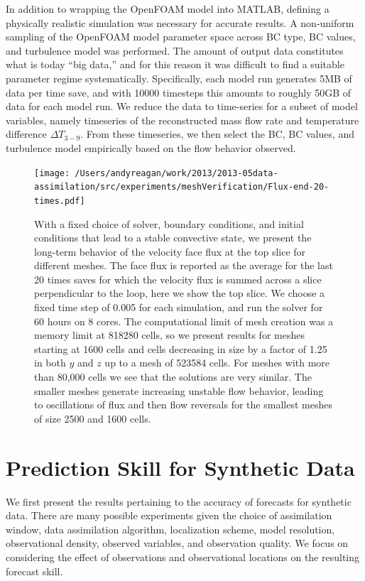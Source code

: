 \documentclass[12pt]{report}
\begin{document}
In addition to wrapping the OpenFOAM model into MATLAB, defining a physically realistic simulation was necessary for accurate results.
A non-uniform sampling of the OpenFOAM model parameter space across BC type, BC values, and turbulence model was performed.
The amount of output data constitutes what is today ``big data,'' and for this reason it was difficult to find a suitable parameter regime systematically.
Specifically, each model run generates 5MB of data per time save, and with 10000 timesteps this amounts to roughly 50GB of data for each model run.
We reduce the data to time-series for a subset of model variables, namely timeseries of the reconstructed mass flow rate and temperature difference $\Delta T_{3-9}$.
From these timeseries, we then select the BC, BC values, and turbulence model empirically based on the flow behavior observed.

\begin{figure}[h!]
  \centering
    \texttt{[image: /Users/andyreagan/work/2013/2013-05data-assimilation/src/experiments/meshVerification/Flux-end-20-times.pdf]}
  \caption[Long-term behavior for different meshes]
  {
    With a fixed choice of solver, boundary conditions, and initial conditions that lead to a stable convective state, we present the long-term behavior of the velocity face flux at the top slice for different meshes.
    The face flux is reported as the average for the last 20 times saves for which the velocity flux is summed across a slice perpendicular to the loop, here we show the top slice.
    We choose a fixed time step of 0.005 for each simulation, and run the solver for 60 hours on 8 cores.
    The computational limit of mesh creation was a memory limit at 818280 cells, so we present results for meshes starting at 1600 cells and cells decreasing in size by a factor of 1.25 in both $y$ and $z$ up to a mesh of 523584 cells.
    For meshes with more than 80,000 cells we see that the solutions are very similar.
    The smaller meshes generate increasing unstable flow behavior, leading to oscillations of flux and then flow reversals for the smallest meshes of size 2500 and 1600 cells.
  }
  \label{fig:meshverification}
\end{figure}

\section{Prediction Skill for Synthetic Data}

We first present the results pertaining to the accuracy of forecasts for synthetic data.
There are many possible experiments given the choice of assimilation window, data assimilation algorithm, localization scheme, model resolution, observational density, observed variables, and observation quality.
We focus on considering the effect of observations and observational locations on the resulting forecast skill.
\end{document}
